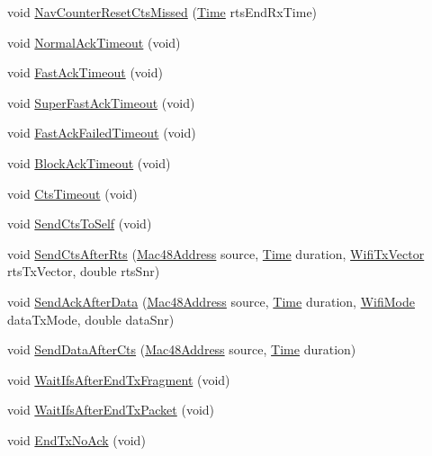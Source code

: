 \begin{DoxyCompactItemize}
\item 
void \hyperlink{classns3_1_1MacLow_af0f8457a65c1870cbba6289da87f96d6}{Nav\+Counter\+Reset\+Cts\+Missed} (\hyperlink{classns3_1_1Time}{Time} rts\+End\+Rx\+Time)
\item 
void \hyperlink{classns3_1_1MacLow_a4d730ac2acea66982b4d257e06e22387}{Normal\+Ack\+Timeout} (void)
\item 
void \hyperlink{classns3_1_1MacLow_aa893a4401552fa384df6195578013b45}{Fast\+Ack\+Timeout} (void)
\item 
void \hyperlink{classns3_1_1MacLow_ac1b528bbd4c14f0a7c4575c0fee242ee}{Super\+Fast\+Ack\+Timeout} (void)
\item 
void \hyperlink{classns3_1_1MacLow_a6d34fa0fc66def64bcad964b5483605c}{Fast\+Ack\+Failed\+Timeout} (void)
\item 
void \hyperlink{classns3_1_1MacLow_ace1131b4f6ea4f1d74a7c0ba470c84ac}{Block\+Ack\+Timeout} (void)
\item 
void \hyperlink{classns3_1_1MacLow_a35adb9b4c7f1035da2cb080289ba9cf7}{Cts\+Timeout} (void)
\item 
void \hyperlink{classns3_1_1MacLow_a209c346576d367ef16cfa1cfdefff909}{Send\+Cts\+To\+Self} (void)
\item 
void \hyperlink{classns3_1_1MacLow_aebcd4c3e8d64fb53af1f8a862c766e33}{Send\+Cts\+After\+Rts} (\hyperlink{classns3_1_1Mac48Address}{Mac48\+Address} source, \hyperlink{classns3_1_1Time}{Time} duration, \hyperlink{classns3_1_1WifiTxVector}{Wifi\+Tx\+Vector} rts\+Tx\+Vector, double rts\+Snr)
\item 
void \hyperlink{classns3_1_1MacLow_a8db1635644b89072dfcb5fbc2330031b}{Send\+Ack\+After\+Data} (\hyperlink{classns3_1_1Mac48Address}{Mac48\+Address} source, \hyperlink{classns3_1_1Time}{Time} duration, \hyperlink{classns3_1_1WifiMode}{Wifi\+Mode} data\+Tx\+Mode, double data\+Snr)
\item 
void \hyperlink{classns3_1_1MacLow_a063bab2ef4e7320a3f8cfa9890090ab6}{Send\+Data\+After\+Cts} (\hyperlink{classns3_1_1Mac48Address}{Mac48\+Address} source, \hyperlink{classns3_1_1Time}{Time} duration)
\item 
void \hyperlink{classns3_1_1MacLow_a3087bf08c1005df5654ede7311173e4f}{Wait\+Ifs\+After\+End\+Tx\+Fragment} (void)
\item 
void \hyperlink{classns3_1_1MacLow_a17e509f5f61f862d9a49d01d7cf3a821}{Wait\+Ifs\+After\+End\+Tx\+Packet} (void)
\item 
void \hyperlink{classns3_1_1MacLow_ab27ec174aebeec55b0fd44e872c0e777}{End\+Tx\+No\+Ack} (void)

\end{DoxyCompactItemize}
